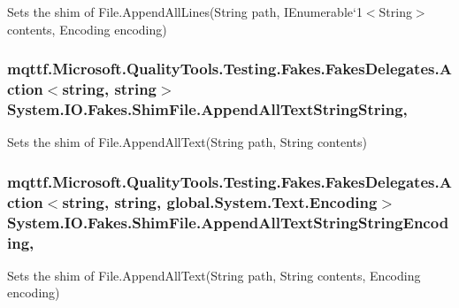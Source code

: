 Sets the shim of File.\-Append\-All\-Lines(String path, I\-Enumerable`1$<$String$>$ contents, Encoding encoding)

\hypertarget{class_system_1_1_i_o_1_1_fakes_1_1_shim_file_a38f4cae7502ad7ff1b88efa42ddc705f}{
\subsubsection[{Append\-All\-Text\-String\-String}]{\setlength{\rightskip}{0pt plus 5cm}mqttf.\-Microsoft.\-Quality\-Tools.\-Testing.\-Fakes.\-Fakes\-Delegates.\-Action$<$string, string$>$ System.\-I\-O.\-Fakes.\-Shim\-File.\-Append\-All\-Text\-String\-String\hspace{0.3cm}{\ttfamily [static]}, {\ttfamily [set]}}}\label{class_system_1_1_i_o_1_1_fakes_1_1_shim_file_a38f4cae7502ad7ff1b88efa42ddc705f}


Sets the shim of File.\-Append\-All\-Text(\-String path, String contents)

\hypertarget{class_system_1_1_i_o_1_1_fakes_1_1_shim_file_aa97941d8669090b0c0c6670d3b81d3c1}{
\subsubsection[{Append\-All\-Text\-String\-String\-Encoding}]{\setlength{\rightskip}{0pt plus 5cm}mqttf.\-Microsoft.\-Quality\-Tools.\-Testing.\-Fakes.\-Fakes\-Delegates.\-Action$<$string, string, global.\-System.\-Text.\-Encoding$>$ System.\-I\-O.\-Fakes.\-Shim\-File.\-Append\-All\-Text\-String\-String\-Encoding\hspace{0.3cm}{\ttfamily [static]}, {\ttfamily [set]}}}\label{class_system_1_1_i_o_1_1_fakes_1_1_shim_file_aa97941d8669090b0c0c6670d3b81d3c1}


Sets the shim of File.\-Append\-All\-Text(\-String path, String contents, Encoding encoding)

